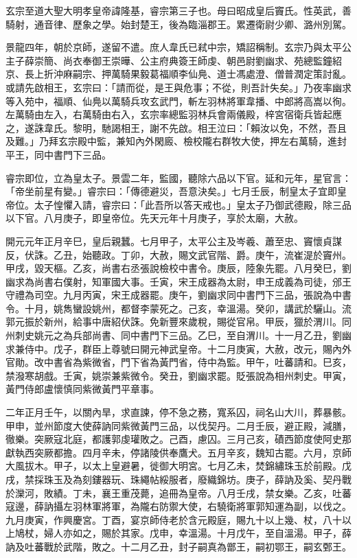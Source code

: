 \begin{pinyinscope}
 玄宗至道大聖大明孝皇帝諱隆基，睿宗第三子也。母曰昭成皇后竇氏。性英武，善騎射，通音律、歷象之學。始封楚王，後為臨淄郡王。累遷衛尉少卿、潞州別駕。



 景龍四年，朝於京師，遂留不遣。庶人韋氏已弒中宗，矯詔稱制。玄宗乃與太平公主子薛崇簡、尚衣奉御王崇曄、公主府典簽王師虔、朝邑尉劉幽求、苑總監鐘紹京、長上折沖麻嗣宗、押萬騎果毅葛福順李仙鳧、道士馮處澄、僧普潤定策討亂。或請先啟相王，玄宗曰：「請而從，是王與危事；不從，則吾計失矣。」乃夜率幽求等入苑中，福順、仙鳧以萬騎兵攻玄武門，斬左羽林將軍韋播、中郎將高嵩以徇。左萬騎由左入，右萬騎由右入，玄宗率總監羽林兵會兩儀殿，梓宮宿衛兵皆起應之，遂誅韋氏。黎明，馳謁相王，謝不先啟。相王泣曰：「賴汝以免，不然，吾且及難。」乃拜玄宗殿中監，兼知內外閑廄、檢校隴右群牧大使，押左右萬騎，進封平王，同中書門下三品。



 睿宗即位，立為皇太子。景雲二年，監國，聽除六品以下官。延和元年，星官言：「帝坐前星有變。」睿宗曰：「傳德避災，吾意決矣。」七月壬辰，制皇太子宜即皇帝位。太子惶懼入請，睿宗曰：「此吾所以答天戒也。」皇太子乃御武德殿，除三品以下官。八月庚子，即皇帝位。先天元年十月庚子，享於太廟，大赦。



 開元元年正月辛巳，皇后親蠶。七月甲子，太平公主及岑羲、蕭至忠、竇懷貞謀反，伏誅。乙丑，始聽政。丁卯，大赦，賜文武官階、爵。庚午，流崔湜於竇州。甲戌，毀天樞。乙亥，尚書右丞張說檢校中書令。庚辰，陸象先罷。八月癸巳，劉幽求為尚書右僕射，知軍國大事。壬寅，宋王成器為太尉，申王成義為司徒，邠王守禮為司空。九月丙寅，宋王成器罷。庚午，劉幽求同中書門下三品，張說為中書令。十月，姚雋蠻設姚州，都督李蒙死之。己亥，幸溫湯。癸卯，講武於驪山。流郭元振於新州，給事中唐紹伏誅。免新豐來歲稅，賜從官帛。甲辰，獵於渭川。同州刺史姚元之為兵部尚書、同中書門下三品。乙巳，至自渭川。十一月乙丑，劉幽求兼侍中。戊子，群臣上尊號曰開元神武皇帝。十二月庚寅，大赦，改元，賜內外官勛。改中書省為紫微省，門下省為黃門省，侍中為監。甲午，吐蕃請和。巳亥，禁潑寒胡戲。壬寅，姚崇兼紫微令。癸丑，劉幽求罷。貶張說為相州刺史。甲寅，黃門侍郎盧懷慎同紫微黃門平章事。



 二年正月壬午，以關內旱，求直諫，停不急之務，寬系囚，祠名山大川，葬暴骸。甲申，並州節度大使薛訥同紫微黃門三品，以伐契丹。二月壬辰，避正殿，減膳，徹樂。突厥寇北庭，都護郭虔瓘敗之。己酉，慮囚。三月己亥，磧西節度使阿史那獻執西突厥都擔。四月辛未，停諸陵供奉鷹犬。五月辛亥，魏知古罷。六月，京師大風拔木。甲子，以太上皇避暑，徙御大明宮。七月乙未，焚錦繡珠玉於前殿。戊戌，禁採珠玉及為刻鏤器玩、珠繩帖綏服者，廢織錦坊。庚子，薛訥及奚、契丹戰於灤河，敗績。丁未，襄王重茂薨，追冊為皇帝。八月壬戌，禁女樂。乙亥，吐蕃寇邊，薛訥攝左羽林軍將軍，為隴右防禦大使，右驍衛將軍郭知運為副，以伐之。九月庚寅，作興慶宮。丁酉，宴京師侍老於含元殿庭，賜九十以上幾、杖，八十以上鳩杖，婦人亦如之，賜於其家。戊申，幸溫湯。十月戊午，至自溫湯。甲子，薛訥及吐蕃戰於武階，敗之。十二月乙丑，封子嗣真為鄫王，嗣初鄂王，嗣玄鄄王。




\end{pinyinscope}
